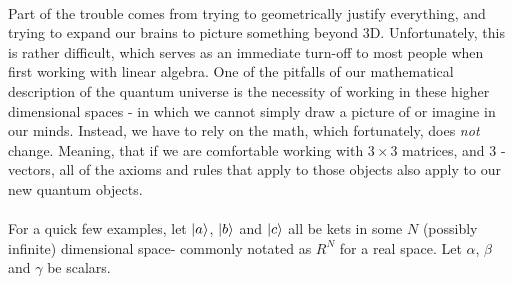 \documentclass[12pt,letterpaper]{book}
\begin{document}
\paragraph*{}Part of the trouble comes from trying to geometrically justify everything, and trying to expand our brains to picture something beyond 3D. Unfortunately, this is rather difficult, which serves as an immediate turn-off to most people when first working with linear algebra. One of the pitfalls of our mathematical description of the quantum universe is the necessity of working in these higher dimensional spaces - in which we cannot simply draw a picture of or imagine in our minds. Instead, we have to rely on the math, which fortunately, does \textit{not} change. Meaning, that if we are comfortable working with $3 \times 3$ matrices, and 3 -vectors, all of the axioms and rules that apply to those objects also apply to our new quantum objects.
\paragraph*{}For a quick few examples, let $\ket{a}$, $\ket{b}$ and $\ket{c}$ all be kets in some $N$ (possibly infinite) dimensional space- commonly notated as $R^N$ for a real space. Let $\alpha$, $\beta$ and $\gamma$ be scalars. 
\end{document}
